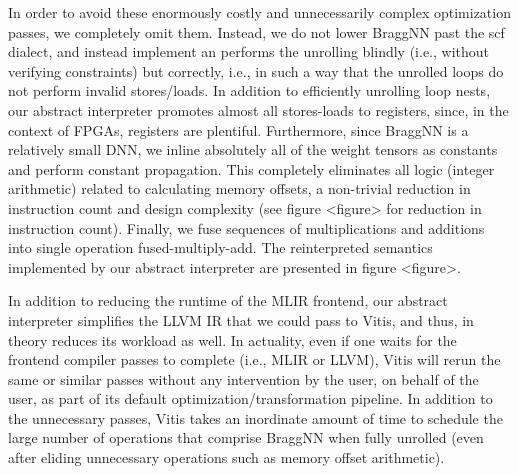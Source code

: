In order to avoid these enormously costly and unnecessarily complex optimization passes, we completely omit them.
Instead, we do not lower BraggNN past the scf dialect, and instead implement an performs the unrolling blindly (i.e., without verifying constraints) but correctly, i.e., in such a way that the unrolled loops do not perform invalid stores/loads.
In addition to efficiently unrolling loop nests, our abstract interpreter promotes almost all stores-loads to registers, since, in the context of FPGAs, registers are plentiful.
Furthermore, since BraggNN is a relatively small DNN, we inline absolutely all of the weight tensors as constants and perform constant propagation.
This completely eliminates all logic (integer arithmetic) related to calculating memory offsets, a non-trivial reduction in instruction count and design complexity (see figure <figure> for reduction in instruction count).
Finally, we fuse sequences of multiplications and additions into single operation fused-multiply-add.
The reinterpreted semantics implemented by our abstract interpreter are presented in figure <figure>.


In addition to reducing the runtime of the MLIR frontend, our abstract interpreter simplifies the LLVM IR that we could pass to Vitis, and thus, in theory reduces its workload as well.
In actuality, even if one waits for the frontend compiler passes to complete (i.e., MLIR or LLVM), Vitis will rerun the same or similar passes without any intervention by the user, on behalf of the user, as part of its default optimization/transformation pipeline.
In addition to the unnecessary passes, Vitis takes an inordinate amount of time to schedule the large number of operations that comprise BraggNN when fully unrolled (even after eliding unnecessary operations such as memory offset arithmetic).

